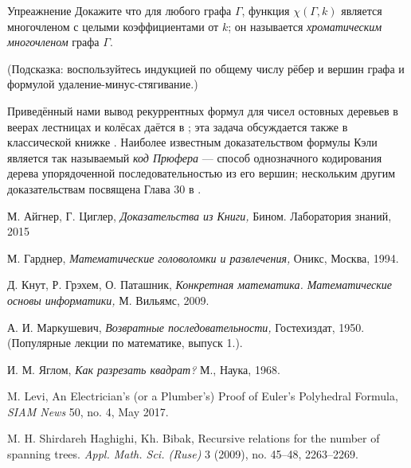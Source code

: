 \documentclass{article}
\begin{document}
\begin{thm}{Упреажнение}
Докажите что для любого графа $\Gamma$, функция $\chi(\Gamma,k)$ является многочленом с целыми коэффициентами от $k$;
он называется \emph{хроматическим многочленом} графа $\Gamma$.

(Подсказка: воспользуйтесь индукцией по общему числу рёбер и вершин графа и формулой удаление-минус-стягивание.)
\end{thm}




Приведённый нами вывод рекуррентных формул для чисел ос\-тов\-ных деревьев в веерах лестницах и колёсах даётся в \cite{haghighi-bibak};
эта задача обсуждается также в классической книжке \cite{knut}.
Наиболее известным доказательством формулы Кэли является так называемый \emph{код Прюфера} --- способ однозначного кодирования дерева упорядоченной последовательностью из его вершин; нескольким другим доказательствам посвящена Глава 30  в \cite{aigner-ziegler}.

\begin{thebibliography}{52}

 М. Айгнер, Г. Циглер, 
\emph{Доказательства из Книги,} 
Бином. Лаборатория знаний, 2015 

 М. Гарднер, \emph{Математические головоломки и развлечения,}  Оникс, Москва, 1994.

Д. Кнут, Р. Грэхем, О. Паташник,
\emph{Конкретная математика. Математические основы информатики,}
М. Вильямс, 
2009.

А. И. Маркушевич,
\emph{Возвратные последовательности,} 
Гостехиздат, 1950. 
(Популярные лекции по математике, выпуск 1.).


И. М. Яглом,
\emph{Как разрезать квадрат?}
М., Наука, 1968.

 M. Levi,
An Electrician’s (or a Plumber’s)
Proof of Euler’s Polyhedral Formula,
\emph{SIAM News} 50, no. 4, May 2017.


 M. H. Shirdareh Haghighi, Kh. Bibak, 
Recursive relations for the number of spanning trees. 
\emph{Appl. Math. Sci. (Ruse)} 3 (2009), no. 45--48, 2263--2269. 
\end{thebibliography}
\end{document}
